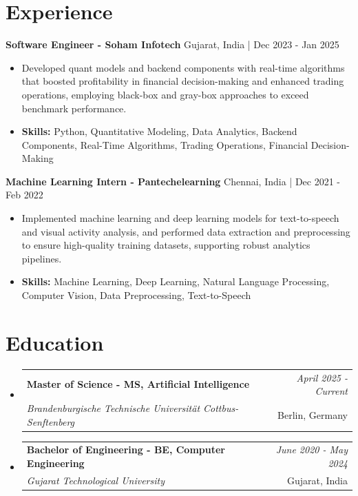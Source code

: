 \documentclass[a4paper,11pt]{article}
\makeatletter
\newcommand{\resumeSubheading}[4]{
\vspace{0.5mm}\item
    \begin{tabular*}{\linewidth}[t]{l@{\extracolsep{\fill}}r}
        \textbf{#1} & \textit{\footnotesize{#4}} \\
        \textit{\footnotesize{#3}} &  \footnotesize{#2}\\
    \end{tabular*}
    \vspace{-2.4mm}
}
\makeatother
\begin{document}
\section{\textbf{Experience}}


\vspace{1mm}
  \textbf{Software Engineer - Soham Infotech} \hfill Gujarat, India | Dec 2023 - Jan 2025
\vspace{-1.5mm} %
\begin{itemize}
  \item Developed quant models and backend components with real-time algorithms that boosted profitability in financial decision-making and enhanced trading operations, employing black-box and gray-box approaches to exceed benchmark performance.

\vspace{-2mm}
  \item \textbf{Skills:} Python, Quantitative Modeling, Data Analytics, Backend Components, Real-Time Algorithms, Trading Operations, Financial Decision-Making
\end{itemize}

\vspace{1mm}
  \textbf{Machine Learning Intern - Pantechelearning} \hfill Chennai, India | Dec 2021 - Feb 2022
\vspace{-1.5mm} %
\begin{itemize}
  \item Implemented machine learning and deep learning models for text-to-speech and visual activity analysis, and performed data extraction and preprocessing to ensure high-quality training datasets, supporting robust analytics pipelines.
\vspace{-2mm}
  \item \textbf{Skills:} Machine Learning, Deep Learning, Natural Language Processing, Computer Vision, Data Preprocessing, Text-to-Speech
\end{itemize}\section{\textbf{Education}}
\vspace{-0.4mm}

\begin{itemize}[leftmargin=0.15in, label={}]
\resumeSubheading
{Master of Science - MS, Artificial Intelligence }{Berlin, Germany}
{Brandenburgische Technische Universität Cottbus-Senftenberg  }{April 2025 - Current}

\vspace{1.0mm} %
\resumeSubheading
{Bachelor of Engineering - BE, Computer Engineering  }{Gujarat, India}
{Gujarat Technological University }{June 2020 - May 2024}

\end{itemize}
\end{document}
